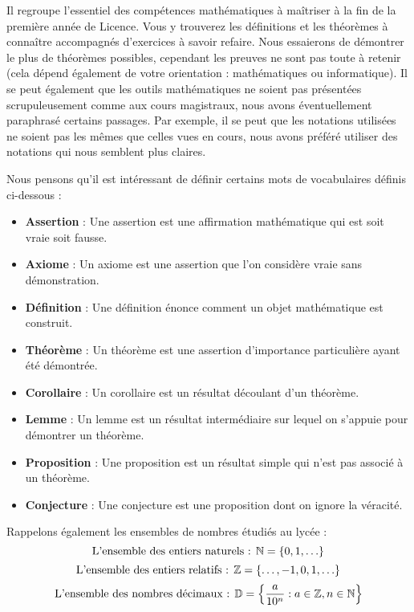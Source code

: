 \par \noindent Il regroupe l'essentiel des compétences mathématiques à maîtriser à la fin de la première année de Licence. Vous y trouverez les définitions et les théorèmes à connaître accompagnés d'exercices à savoir refaire. Nous essaierons de démontrer le plus de théorèmes possibles, cependant les preuves ne sont pas toute à retenir (cela dépend également de votre orientation : mathématiques ou informatique).
Il se peut également que les outils mathématiques ne soient pas présentées scrupuleusement comme aux cours magistraux, nous avons éventuellement paraphrasé certains passages. Par exemple, il se peut que les notations utilisées ne soient pas les mêmes que celles vues en cours, nous avons préféré utiliser des notations qui nous semblent plus claires.
\\
\par \noindent Nous pensons qu'il est intéressant de définir certains mots de vocabulaires définis ci-dessous :
\begin{itemize}
    \item \textbf{Assertion} : Une assertion est une affirmation mathématique qui est soit vraie soit fausse. 
    \item \textbf{Axiome} : Un axiome est une assertion que l'on considère vraie sans démonstration.
    \item \textbf{Définition} : Une définition énonce comment un objet mathématique est construit.
    \item \textbf{Théorème} : Un théorème est une assertion d'importance particulière ayant été démontrée.
    \item \textbf{Corollaire} : Un corollaire est un résultat découlant d'un théorème.
    \item \textbf{Lemme} : Un lemme est un résultat intermédiaire sur lequel on s'appuie pour démontrer un théorème.
    \item \textbf{Proposition} : Une proposition est un résultat simple qui n'est pas associé à un théorème.
    \item \textbf{Conjecture} : Une conjecture est une proposition dont on ignore la véracité.
\end{itemize}
\par \noindent Rappelons également les ensembles de nombres étudiés au lycée :
\[ \text{L'ensemble des entiers naturels : } \mathbb{N} = \{0, 1, \ldots \} \]
\[ \text{L'ensemble des entiers relatifs : } \mathbb{Z} = \{ \ldots, -1, 0, 1, \ldots \} \]
\[ \text{L'ensemble des nombres décimaux : } \mathbb{D} = \left\{ \frac{a}{10^n} : a \in \mathbb{Z}, n \in \mathbb{N} \right\} \]
